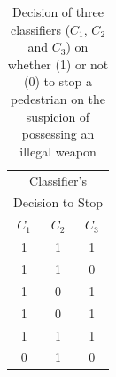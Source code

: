 \documentclass[runningheads]{llncs}
\begin{document}
\begin{table}[!htbp]
\begin{minipage}{.20\linewidth}
\begin{tabular}{c|c|c}
        \hline
\multicolumn{3}{c}{Classifier's} \\
\multicolumn{3}{c}{Decision to Stop} \\
\hline
$C_1$   &	$C_2$    &	$C_3$\\
\hline
1   &  1 & 1\\
\hline
1   &  1 & 0\\
\hline
1   &  0 & 1\\
\hline
1   &  0 & 1\\
\hline
1   &  1 & 1\\
\hline
0   &  1 & 0\\
\hline
\end{tabular}
\end{minipage}%
\\
\caption{Decision of three classifiers ($C_1$, $C_2$ and $C_3$) on whether (1) or not (0) to stop a pedestrian on the suspicion of possessing an illegal weapon}
\label{fig:disparates}
\end{table}
\end{document}
